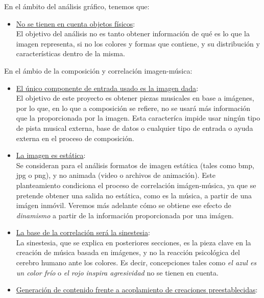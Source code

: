 		
		En el ámbito del análisis gráfico, tenemos que:
		\begin{itemize}
		
		\item \underline{No se tienen en cuenta objetos físicos}:\\
			El objetivo del análisis no es tanto obtener información de qué es lo que la imagen representa, si no los colores y formas que contiene, y su distribución y características dentro de la misma.
		\end{itemize}
		
		En el ámbio de la composición y correlación imagen-música:
		
		\begin{itemize}
		
		\item \underline{El único componente de entrada usado es la imagen dada}:\\
			El objetivo de este proyecto es obtener piezas musicales en base a imágenes, por lo que, en lo que a composición se refiere, no se usará más información que la proporcionada por la imagen. Esta caracteríca impide usar ningún tipo de pista musical externa, base de datos o cualquier tipo de entrada o ayuda externa en el proceso de composición.
		\item \underline{La imagen es estática}:\\
			Se consideran para el análisis formatos de imagen estática (tales como bmp, jpg o png), y no animada (video o archivos de animación). Este planteamiento condiciona el proceso de correlación imágen-música, ya que se pretende obtener una salida no estática, como es la música, a partir de una imágen inmóvil. Veremos más adelante cómo se obtiene ese efecto de \emph{dinamismo} a partir de la información proporcionada por una imágen.
		\item \underline{La base de la correlación será la sinestesia}:\\	
			La sinestesia, que se explica en posteriores secciones, es la pieza clave en la creación de música basada en imágenes, y no la reacción psicológica del cerebro humano ante los colores. Es decir, concepciones tales como \emph{el azul es un color frío} o \emph{el rojo inspira agresividad} no se tienen en cuenta.\\
		\item \underline{Generación de contenido frente a acoplamiento de creaciones preestablecidas}:\\				

\end{itemize}
